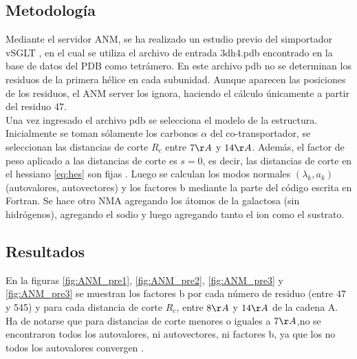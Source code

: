 \subsection{Metodolog\'{i}a}
Mediante el servidor ANM, se ha realizado un estudio previo del simportador vSGLT   \cite{Cabrera2017} , en el cual se utiliza el archivo de entrada 3dh4.pdb \cite{Faham2008} encontrado en la base de datos del PDB como tetr\'{a}mero. En este archivo pdb no se determinan los residuos de la primera h\'{e}lice en cada subunidad. Aunque aparecen las posiciones de los residuos, el ANM server los ignora, haciendo el c\'{a}lculo \'{u}nicamente a partir del residuo 47.\\

Una vez ingresado el archivo pdb se selecciona el modelo de la estructura. Inicialmente se toman s\'{o}lamente los carbonos $\alpha$ del co-transportador, se seleccionan las distancias de corte $R_c$ entre $7\AA$ y $14\AA$. Adem\'{a}s, el factor de peso aplicado a las distancias de corte es $s=0$, es decir, las distancias de corte en el hessiano \eqref{eq:hes} son fijas \cite{Zimmermann2011}. Luego se calculan los modos normales $(\lambda_k,a_k)$ (autovalores, autovectores) y los factores b mediante la parte del c\'{o}digo escrita en Fortran. Se hace otro NMA agregando los \'{a}tomos de la galactosa (sin hidr\'{o}genos), agregando el sodio y luego agregando tanto el ion como el sustrato.\\
\subsection{Resultados}
En la figuras \ref{fig:ANM_pre1}, \ref{fig:ANM_pre2}, \ref{fig:ANM_pre3} y \ref{fig:ANM_pre3} se muestran los factores b por cada n\'{u}mero de residuo (entre 47 y 545) y para cada distancia de corte $R_c$, entre $8\AA$ y $14\AA$ de la cadena A. Ha de notarse que para distancias de corte menores o iguales a $7\AA$,no se encontraron todos  los autovalores, ni autovectores, ni factores b, ya que los no todos los autovalores convergen \cite{Zimmermann2011}.\\

